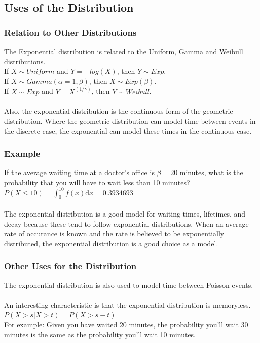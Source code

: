 \documentclass{article}
\begin{document}
\subsection*{Uses of the Distribution}

\subsubsection*{Relation to Other Distributions}
The Exponential distribution is related to the Uniform, Gamma and Weibull distributions.
\\
If $X\sim Uniform$ and $Y=-log(X)$, then $Y\sim Exp$.
\\
If $X\sim Gamma(\alpha = 1, \beta)$, then $X\sim Exp(\beta)$.
\\
If $X\sim Exp$ and $Y=X^{(1/\gamma)}$, then $Y\sim Weibull$. 
\\
\\Also, the exponential distribution is the continuous form of the geometric distribution.  Where the geometric distribution can model time between events in the discrete case, the exponential can model these times in the continuous case.
\subsubsection*{Example}
If the average waiting time at a doctor's office is $\beta = 20$ minutes, what is the probability that you will have to wait less than 10 minutes?
\\
$P(X \leq 10) = \int_0^{10} f(x)\mathrm{d}x = 0.3934693$
\\
\\The exponential distribution is a good model for waiting times, lifetimes, and decay because these tend to follow exponential distributions.  When an average rate of occurance is known and the rate is believed to be exponentially distributed, the exponential distribution is a good choice as a model.    


\subsubsection*{Other Uses for the Distribution}
 
The exponential distribution is also used to model time between Poisson events.   
\\
\\
An interesting characteristic is that the exponential distribution is memoryless.
\\
$P( X > s | X> t) = P(X > s-t)$
\\
For example: Given you have waited 20 minutes, the probability you'll wait 30 minutes is the same as the probability you'll wait 10 minutes. 
 
\end{document}
